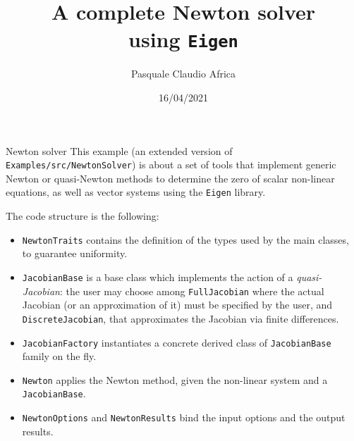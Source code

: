 \documentclass[10pt]{beamer}
\begin{document}
    \title{A complete Newton solver\protect\\ using \texttt{Eigen}}
    \author{Pasquale Claudio Africa}
    \date{16/04/2021}

\begin{frame}
    \maketitle
\end{frame}

\begin{frame}{Newton solver}
This example (an extended version of \texttt{Examples/src/NewtonSolver}) is about a set of tools that implement generic Newton or quasi-Newton methods to determine the zero of scalar non-linear equations, as well as vector systems using the \texttt{Eigen} library.

The code structure is the following:
\begin{itemize}
\item \texttt{NewtonTraits} contains the definition of the types used by the main classes, to guarantee uniformity.
\item \texttt{JacobianBase} is a base class which implements the action of a \textit{quasi-Jacobian}: the user may choose among \texttt{FullJacobian} where the actual Jacobian (or an approximation of it) must be specified by the user, and \texttt{DiscreteJacobian}, that approximates the Jacobian via finite differences.
\item \texttt{JacobianFactory} instantiates a concrete derived class of \texttt{JacobianBase} family on the fly.
\item \texttt{Newton} applies the Newton method, given the non-linear system and a \texttt{JacobianBase}.
\item \texttt{NewtonOptions} and \texttt{NewtonResults} bind the input options and the output results.
\end{itemize}
\end{frame}
\end{document}

